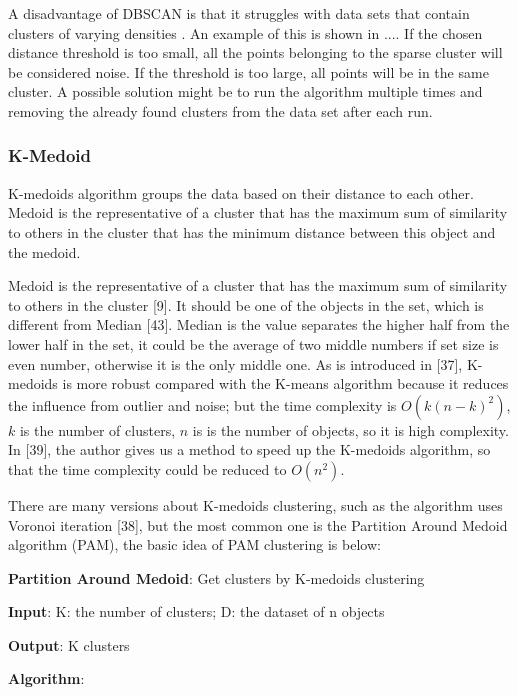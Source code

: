 \documentclass[a4paper, 12pt]{article}
\begin{document}
A disadvantage of DBSCAN is that it struggles with data sets that contain clusters of varying densities \citep{ertoz2003finding}. An example of this is shown in .... If the chosen distance threshold is too small, all the points belonging to the sparse cluster will be considered noise. If the threshold is too large, all points will be in the same cluster. A possible solution might be to run the algorithm multiple times and removing the already found clusters from the data set after each run.

\subsubsection{K-Medoid}
K-medoids algorithm groups the data based on their distance to each other. Medoid is the representative of a cluster that has the maximum sum of similarity to others in the cluster that has the minimum distance between this object and the medoid.

Medoid is the representative of a cluster that has the maximum sum of similarity to others in the cluster [9]. It should be one of the objects in the set, which is different from Median [43]. Median is the value separates the higher half from the lower half in the set, it could be the average of two middle numbers if set size is even number, otherwise it is the only middle one. As is introduced in [37], K-medoids is more robust compared with the K-means algorithm because it reduces the influence from outlier and noise; but the time complexity is $O(k(n-k)^2)$, $k$ is the number of clusters, $n$ is is the number
of objects, so it is high complexity. In [39], the author gives us a method to speed up the K-medoids algorithm, so that the time complexity could be reduced to $O(n^2)$.

There are many versions about K-medoids clustering, such as the algorithm uses Voronoi iteration [38], but the most common one is the Partition Around Medoid algorithm (PAM), the basic idea of PAM clustering is below:

\textbf{Partition Around Medoid}: Get clusters by K-medoids clustering

\textbf{Input}: K: the number of clusters; D: the dataset of n objects

\textbf{Output}: K clusters

\textbf{Algorithm}:
\end{document}
